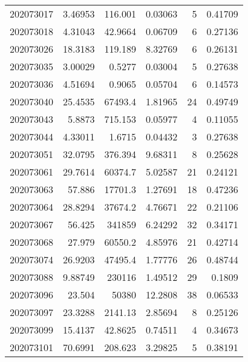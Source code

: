 \begin{tabular}{rrrrrr}
 202073017 &          3.46953 &      116.001  &            0.03063 &           5 & 0.41709 \\
 202073018 &          4.31043 &       42.9664 &            0.06709 &           6 & 0.27136 \\
 202073026 &         18.3183  &      119.189  &            8.32769 &           6 & 0.26131 \\
 202073035 &          3.00029 &        0.5277 &            0.03004 &           5 & 0.27638 \\
 202073036 &          4.51694 &        0.9065 &            0.05704 &           6 & 0.14573 \\
 202073040 &         25.4535  &    67493.4    &            1.81965 &          24 & 0.49749 \\
 202073043 &          5.8873  &      715.153  &            0.05977 &           4 & 0.11055 \\
 202073044 &          4.33011 &        1.6715 &            0.04432 &           3 & 0.27638 \\
 202073051 &         32.0795  &      376.394  &            9.68311 &           8 & 0.25628 \\
 202073061 &         29.7614  &    60374.7    &            5.02587 &          21 & 0.24121 \\
 202073063 &         57.886   &    17701.3    &            1.27691 &          18 & 0.47236 \\
 202073064 &         28.8294  &    37674.2    &            4.76671 &          22 & 0.21106 \\
 202073067 &         56.425   &   341859      &            6.24292 &          32 & 0.34171 \\
 202073068 &         27.979   &    60550.2    &            4.85976 &          21 & 0.42714 \\
 202073074 &         26.9203  &    47495.4    &            1.77776 &          26 & 0.48744 \\
 202073088 &          9.88749 &   230116      &            1.49512 &          29 & 0.1809  \\
 202073096 &         23.504   &    50380      &           12.2808  &          38 & 0.06533 \\
 202073097 &         23.3288  &     2141.13   &            2.85694 &           8 & 0.25126 \\
 202073099 &         15.4137  &       42.8625 &            0.74511 &           4 & 0.34673 \\
 202073101 &         70.6991  &      208.623  &            3.29825 &           5 & 0.38191 \\

\end{tabular}
